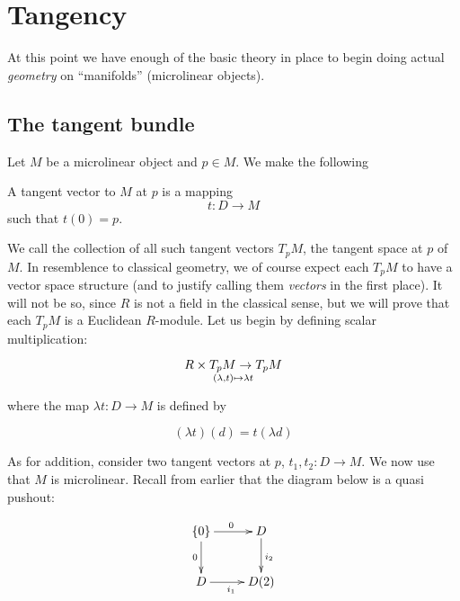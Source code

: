 \section{Tangency}

At this point we have enough of the basic theory in place to begin doing actual \emph{geometry} on ``manifolds'' (microlinear objects).

\subsection{The tangent bundle}

Let \( M \) be a microlinear object and \( p\in M \). We make the following

\begin{defn}
  A tangent vector to \( M \) at \( p \) is a mapping 
  \begin{equation*}
    t:D\to M
  \end{equation*}
  such that \( t(0)=p \).
\end{defn}

We call the collection of all such tangent vectors \( T_pM \), the tangent space at \( p \) of \( M \). In resemblence to classical geometry, we of course expect each \( T_pM \) to have a vector space structure (and to justify calling them \emph{vectors} in the first place). It will not be so, since \( R \) is not a field in the classical sense, but we will prove that each \( T_pM \) is a Euclidean \( R \)-module. Let us begin by defining scalar multiplication:

\begin{equation*}
  R\times T_pM \to T_pM \atop (\lambda,t)\mapsto \lambda t
\end{equation*}

where the map \( \lambda t: D\to M \) is defined by

\begin{equation*}
  (\lambda t)(d) = t(\lambda d)
\end{equation*}

As for addition, consider two tangent vectors at \( p \), \( t_1,t_2:D\to M \). We now use that \( M \) is microlinear. Recall from earlier that the diagram below is a quasi pushout:

\begin{equation}
  \xymatrix{
    {\{0\}} \ar[d]_0 \ar[r]^0   & D \ar[d]^{i_2} \\
    D \ar[r]_{i_1}              & D(2)
  }
  \label{dg:pushoutcopy}
\end{equation}


